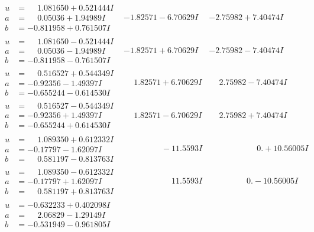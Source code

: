 \documentclass[1p]{elsarticle_modified}
\theoremstyle{definition}
\begin{document}
$$\begin{array}{c|c|c}
\begin{aligned}
u &= \phantom{-}1.081650 + 0.521444 I \\
a &= \phantom{-}0.05036 + 1.94989 I \\
b &= -0.811958 + 0.761507 I\end{aligned}
 & -1.82571 - 6.70629 I & -2.75982 + 7.40474 I \\ \hline\begin{aligned}
u &= \phantom{-}1.081650 - 0.521444 I \\
a &= \phantom{-}0.05036 - 1.94989 I \\
b &= -0.811958 - 0.761507 I\end{aligned}
 & -1.82571 + 6.70629 I & -2.75982 - 7.40474 I \\ \hline\begin{aligned}
u &= \phantom{-}0.516527 + 0.544349 I \\
a &= -0.92356 - 1.49397 I \\
b &= -0.655244 - 0.614530 I\end{aligned}
 & \phantom{-}1.82571 + 6.70629 I & \phantom{-}2.75982 - 7.40474 I \\ \hline\begin{aligned}
u &= \phantom{-}0.516527 - 0.544349 I \\
a &= -0.92356 + 1.49397 I \\
b &= -0.655244 + 0.614530 I\end{aligned}
 & \phantom{-}1.82571 - 6.70629 I & \phantom{-}2.75982 + 7.40474 I \\ \hline\begin{aligned}
u &= \phantom{-}1.089350 + 0.612332 I \\
a &= -0.17797 - 1.62097 I \\
b &= \phantom{-}0.581197 - 0.813763 I\end{aligned}
 & \phantom{-0.000000 } -11.5593 I & \phantom{-0.000000 -}0. + 10.56005 I \\ \hline\begin{aligned}
u &= \phantom{-}1.089350 - 0.612332 I \\
a &= -0.17797 + 1.62097 I \\
b &= \phantom{-}0.581197 + 0.813763 I\end{aligned}
 & \phantom{-0.000000 -}11.5593 I & \phantom{-0.000000 } 0. - 10.56005 I \\ \hline\begin{aligned}
u &= -0.632233 + 0.402098 I \\
a &= \phantom{-}2.06829 - 1.29149 I \\
b &= -0.531949 - 0.961805 I\end{aligned}

\end{array}$$
\end{document}
